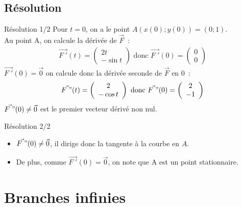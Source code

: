 \documentclass[14pt]{beamer}
\begin{document}
\subsection{Résolution}

\begin{frame}{Résolution 1/2}
Pour $t=0$, on a le point $A(x(0);y(0)) = (0; 1)$.\\
        Au point A, on calcule la dérivée de $\vec{F}$~:
        \begin{align*}
                \vec{F\;'}(t) = \left(\begin{array}{cc}2t\\-\sin t\end{array}\right) \text{ donc }
                \vec{F\;'}(0) = \left(\begin{array}{cc}0\\0\end{array}\right)
        \end{align*}
        $\vec{F\;'}(0)=\vec{0}$ on calcule donc la dérivée seconde de $\vec{F}$ en $0$~:
        \begin{align*}
                \vec{F\;"}(t) = \left(\begin{array}{cc}2\\-\cos t\end{array}\right) \text{ donc }
                \vec{F\;"}(0) = \left(\begin{array}{cc}2\\-1\end{array}\right)
        \end{align*}
        $\vec{F\;"}(0)\ne\vec{0}$ est le premier vecteur dérivé non nul.
\end{frame}

\begin{frame}{Résolution 2/2}
        \begin{itemize}
                \item $\vec{F\;"}(0)\ne\vec{0}$, il dirige donc la tangente à la courbe en $A$.
                \item De plus, comme $\vec{F\;'}(0)=\vec{0}$, on note que A est un point stationnaire.
        \end{itemize}
\end{frame}

\section{Branches infinies}
\end{document}

